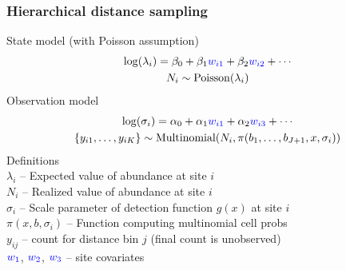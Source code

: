 \documentclass[color=usenames,dvipsnames]{beamer}\usepackage[]{graphicx}\usepackage[]{color}
\begin{document}



\begin{frame}
  \frametitle{Hierarchical distance sampling}
  \small
  State model (with Poisson assumption)
  \begin{gather*}
    \mathrm{log}(\lambda_i) = \beta_0 + \beta_1 {\color{blue} w_{i1}} +
    \beta_2 {\color{blue} w_{i2}} + \cdots \\
    N_i \sim \mathrm{Poisson}(\lambda_i)
  \end{gather*}
  \pause
  Observation model
  \begin{gather*}
    \mathrm{log}(\sigma_{i}) = \alpha_0 + \alpha_1 {\color{blue} w_{i1}}
    + \alpha_2 {\color{blue} w_{i3}} + \cdots \\
    \{y_{i1}, \dots, y_{iK}\}  \sim \mathrm{Multinomial}(N_i,
    \pi(b_1, \dots, b_{J+1}, x, \sigma_i))
  \end{gather*}
  \pause
  \small
  Definitions \\
  $\lambda_i$ -- Expected value of abundance at site $i$ \\
  $N_i$ -- Realized value of abundance at site $i$ \\
  $\sigma_{i}$ -- Scale parameter of detection function $g(x)$ at site $i$ \\
  $\pi(x,b,\sigma_i)$ -- Function computing multinomial cell probs \\
  $y_{ij}$ -- count for distance bin $j$ (final count is unobserved) \\
  $\color{blue} w_1$, $\color{blue} w_2$, $\color{blue} w_3$ -- site covariates %
\end{frame}











\end{document}
